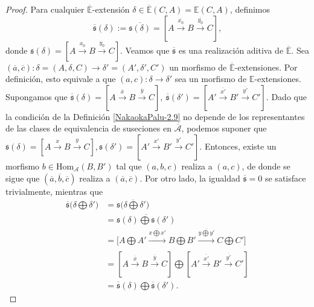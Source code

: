 \documentclass[tesis]{subfiles}
\begin{document}
\begin{proof}
    Para cualquier $\overline{\mathbb{E}}$-extensión $\delta\in \overline{\mathbb{E}}(C,A) = \mathbb{E}(C,A)$, definimos
    \[
        \overline{\mathfrak{s}}(\delta) := \overline{\mathfrak{s}(\delta)} = [A\xrightarrow[]{\overline{x_0}} B\xrightarrow[]{\overline{y_0}} C],
    \] 
    donde $\mathfrak{s}(\delta) = [A\xrightarrow[]{x_0} B\xrightarrow[]{y_0} C]$. Veamos que $\overline{\mathfrak{s}}$ es una realización aditiva de $\overline{\mathbb{E}}$. Sea $(\overline{a},\overline{c}):\delta=(A,\delta,C)\to \delta'=(A',\delta',C')$ un morfismo de $\overline{\mathbb{E}}$-extensiones. Por definición, esto equivale a que $(a,c):\delta\to \delta'$ sea un morfismo de $\mathbb{E}$-extensiones. Supongamos que $\overline{\mathfrak{s}}(\delta) = [A\xrightarrow[]{\overline{x}} B\xrightarrow[]{\overline{y}} C], \ \overline{\mathfrak{s}}(\delta') = [A'\xrightarrow[]{\overline{x'}} B'\xrightarrow[]{\overline{y'}} C']$. Dado que la condición de la Definición \ref{NakaokaPalu-2.9} no depende de los representantes de las clases de equivalencia de suseciones en $\overline{\mathscr{A}}$, podemos suponer que $\mathfrak{s}(\delta) = [A\xrightarrow[]{x} B\xrightarrow[]{y} C], \mathfrak{s}(\delta') = [A'\xrightarrow[]{x'} B'\xrightarrow[]{y'} C']$. Entonces, existe un morfismo $b\in\text{Hom}_\mathscr{A}(B,B')$ tal que $(a,b,c)$ realiza a $(a,c)$, de donde se sigue que $(\overline{a},\overline{b},\overline{c})$ realiza a $(\overline{a}, \overline{c})$. Por otro lado, la igualdad $\overline{\mathfrak{s}} = 0$ se satisface trivialmente, mientras que 
    \begin{align*}
        \overline{\mathfrak{s}}\big(\delta\bigoplus\delta'\big) &= \overline{\mathfrak{s}\big(\delta\bigoplus\delta'\big)} \\
                                                     &= \overline{\mathfrak{s}(\delta) \bigoplus \mathfrak{s}(\delta')} \\
                                                     &= \big[A\bigoplus A'\xrightarrow[]{\overline{x\bigoplus x'}} B\bigoplus B' \xrightarrow[]{\overline{y\bigoplus y'}} C\bigoplus C'\big] \\
                                                     &= [A\xrightarrow[]{\overline{x}} B\xrightarrow[]{\overline{y}} C] \bigoplus [A'\xrightarrow[]{\overline{x'}} B'\xrightarrow[]{\overline{y'}} C'] \\
                                                     &= \overline{\mathfrak{s}}(\delta) \bigoplus \overline{\mathfrak{s}}(\delta').
    \end{align*}


\end{proof}
\end{document}
